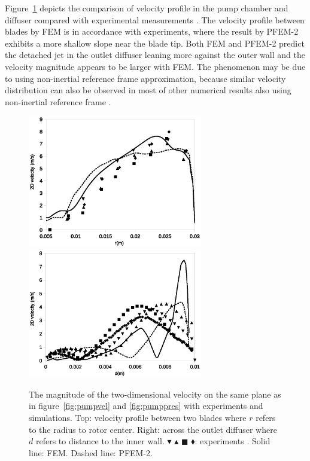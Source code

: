 Figure~\ref{fig:pumpvelprofile} depicts the comparison of velocity profile in the pump chamber and diffuser compared with experimental measurements \cite{mali_cfd}. The velocity profile between blades by FEM is in accordance with experiments, where the result by PFEM-2 exhibits a more shallow slope near the blade tip. Both FEM and PFEM-2 predict the detached jet in the outlet diffuser leaning more against the outer wall and the velocity magnitude appears to be larger with FEM. The phenomenon may be due to using non-inertial reference frame approximation, because similar velocity distribution can also be observed in most of other numerical results also using non-inertial reference frame \cite{mali_cfd}. 
 
\begin{figure}[htbp]
    \centering
    \includegraphics[width=3in]{imgs/nozzle_pump/pump_velblade.eps}\\
    \vspace{.5cm}
    \includegraphics[width=3in]{imgs/nozzle_pump/pump_veldiffuser.eps}
    \caption{The magnitude of the two-dimensional velocity on the same plane as in figure~\ref{fig:pumpvel} and \ref{fig:pumppres} with experiments and simulations. Top: velocity profile between two blades where $r$ refers to the radius to rotor center. Right: across the outlet diffuser where $d$ refers to distance to the inner wall. $\blacktriangledown$ $\blacktriangle$ $\blacksquare$ $\blacklozenge$: experiments \cite{mali_cfd}. Solid line: FEM. Dashed line: PFEM-2. }
    \label{fig:pumpvelprofile}
\end{figure}